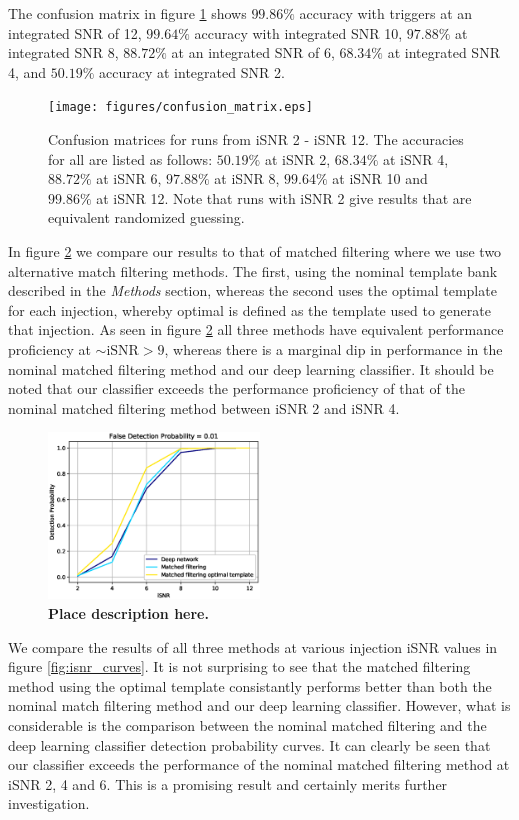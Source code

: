 \documentclass[%
 amsmath,amssymb,
 aps,
 twocolumn,
floatfix,
]{revtex4-1}
\begin{document}
The confusion matrix in figure \ref{fig:confusion} shows $99.86\%$ accuracy with triggers at an integrated SNR of 12, $99.64\%$ accuracy with integrated SNR 10, $97.88\%$ at integrated SNR 8, $88.72\%$ at an integrated SNR of 6, $68.34\%$ at integrated SNR 4, and $50.19\%$ accuracy at integrated SNR 2.


\begin{figure}[]
 
 \texttt{[image: figures/confusion\_matrix.eps]}
 \caption{\label{fig:confusion} Confusion matrices for runs from iSNR 2 - iSNR 12. The accuracies for all are listed as follows: $50.19\%$ at iSNR 2, $68.34\%$ at iSNR 4, $88.72\%$ at iSNR 6, $97.88\%$ at iSNR 8, $99.64\%$ at iSNR 10 and $99.86\%$ at iSNR 12. Note that runs with iSNR 2 give results that are equivalent randomized guessing.}
\end{figure}

In figure \ref{fig:ROC_curve} we compare our results to that of matched filtering where we use two alternative match filtering methods. The first, using the nominal template bank described in the \textit{Methods} section, whereas the second uses the optimal template for each injection, whereby optimal is defined as the template used to generate that injection. As seen in figure \ref{fig:ROC_curve} all three methods have equivalent performance proficiency at $\sim \mathrm{iSNR} > 9$, whereas there is a marginal dip in performance in the nominal matched filtering method and our deep learning classifier. It should be noted that our classifier exceeds the performance proficiency of that of the nominal matched filtering method between iSNR 2 and iSNR 4. 

\begin{figure}[]
 \includegraphics[width=0.5\textwidth]
 {figures/accuracy.eps}
 \caption{\label{fig:ROC_curve} \textbf{Place description here.}}
\end{figure}

We compare the results of all three methods at various injection iSNR values in figure \ref{fig:isnr_curves}. It is not surprising to see that the matched filtering method using the optimal template consistantly performs better than both the nominal match filtering method and our deep learning classifier. However, what is considerable is the comparison between the nominal matched filtering and the deep learning classifier detection probability curves. It can clearly be seen that our classifier exceeds the performance of the nominal matched filtering method at iSNR 2, 4 and 6. This is a promising result and certainly merits further investigation.  
\end{document}
